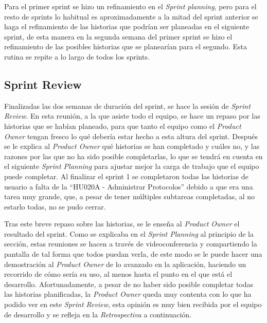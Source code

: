 

Para el primer sprint se hizo un refinamiento en el \emph{Sprint planning}, pero para el resto de sprints lo habitual es aproximadamente a la mitad del sprint anterior se haga el refinamiento de las historias que podrían ser planeadas en el siguiente sprint, de esta manera en la segunda semana del primer sprint se hizo el refinamiento de las posibles historias que se planearían para el segundo. Esta rutina se repite a lo largo de todos los sprints.
 

\subsection{Sprint Review}
\label{subsec:S1-SR}
Finalizadas las dos semanas de duración del sprint, se hace la sesión de \emph{Sprint Review}. En esta reunión, a la que asiste todo el equipo, se hace un repaso por las historias que se habían planeado, para que tanto el equipo como el \emph{Product Owner} tengan fresco lo qué debería estar hecho a esta altura del sprint. Después se le explica al \emph{Product Owner} qué historias se han completado y cuáles no, y las razones por las que no ha sido posible completarlas, lo que se tendrá en cuenta en el siguiente \emph{Sprint Planning} para ajustar mejor la carga de trabajo que el equipo puede completar. Al finalizar el sprint 1 se completaron todas las historias de usuario a falta de la ``HU020A - Administrar Protocolos'' debido a que era una tarea muy grande, que, a pesar de tener múltiples subtareas completadas, al no estarlo todas, no se pudo cerrar.

Tras este breve repaso sobre las historias, se le enseña al \emph{Product Owner} el resultado del sprint. Como se explicaba en el \emph{Sprint Planning} al principio de la sección, estas reuniones se hacen a través de videoconferencia y compartiendo la pantalla de tal forma que todos puedan verla, de este modo se le puede hacer una demostración al \emph{Product Owner} de lo avanzado en la aplicación, haciendo un recorrido de cómo sería su uso, al menos hasta el punto en el que está el desarrollo. Afortunadamente, a pesar de no haber sido posible completar todas las historias planificadas, la \emph{Product Owner} queda muy contenta con lo que ha podido ver en este \emph{Sprint Review}, esta opinión es muy bien recibida por el equipo de desarrollo y se refleja en la \emph{Retrospectiva} a continuación.


